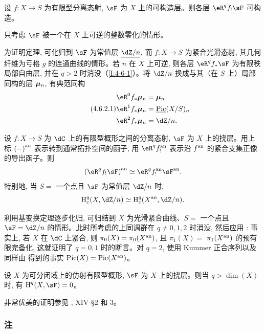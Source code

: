 \begin{theorem}[有限性定理]\label{I:4-6-2}
设 $f:X\to S$ 为有限型分离态射, $\sF$ 为 $X$ 上的可构造层。则各层 $\eR^qf_!\sF$ 可构造。
\end{theorem}

只考虑 $\sF$ 被一个在 $X$ 上可逆的整数零化的情形。

为证明定理, 可化归到 $\sF$ 为常值层 $\const{\dZ/n}$, 而 $f:X\to S$ 为紧合光滑态射, 其几何纤维为亏格 $g$ 的连通曲线的情形。若 $n$ 在 $X$ 上可逆, 则各层 $\eR^qf_*\sF$ 为有限秩局部自由层, 并在 $q>2$ 时消没（\ref{I:4-6-1}）。将 $\dZ/n$ 换成与其（在 $S$ 上）局部同构的层 ${\bm\mu}_n$, 有典范同构
\begin{equation*}\tag{4.6.2.1}\label{I:eq:4-6-2-1}
\begin{aligned}
  \eR^0 f_* \dmu_n &= \dmu_n \\
  \eR^1 f_* \dmu_n &= \const\pic(X/S)_n \\
  \eR^2 f_* \dmu_n &= \dZ/n \text{.}
\end{aligned}
\end{equation*}

\begin{theorem}[与经典上同调的比较]\label{I:4-6-3}
设 $f:X\to S$ 为 $\dC$ 上的有限型概形之间的分离态射, $\sF$ 为 $X$ 上的挠层。用上标 ${(-)}^{\textnormal{an}}$ 表示转到通常拓扑空间的函子, 用 $\eR^q\an f_!$ 表示沿 ${f}^{\textnormal{an}}$ 的紧合支集正像的导出函子。则
\[
  \an{(\eR^q f_! \sF)} \simeq \eR^q \an f_! \an \sF \text{.}
\]
特别地, 当 $S=$ 一个点且 $\sF$ 为常值层 $\dZ/n$ 时,
\[
  \h_c^q(X,\dZ/n) \simeq \h_c^q(\an X,\dZ/n)\text{.}
\]
\end{theorem}

利用基变换定理逐步化归, 可归结到 $X$ 为光滑紧合曲线、$S=$ 一个点且 $\sF=\dZ/n$ 的情形。此时所考虑的上同调群在 $q\ne0,1,2$ 时消没, 然后应用 \cite{se55}: 事实上, 若 $X$ 在 $\dC$ 上紧合, 则 $\pi_0(X)=\pi_0({X}^{\textnormal{an}})$, 且 $\pi_1(X)=$ $\pi_1({X}^{\textnormal{an}})$ 的预有限完备化, 这就证明了 $q=0,1$ 时的断言。对 $q=2$, 使用 Kummer 正合序列以及同样由 \cite{se55} 得到的事实 $\operatorname{Pic}(X)=\operatorname{Pic}({X}^{\textnormal{an}})$。

\begin{theorem}[仿射概形的上同调维数]\label{I:4-6-4}
设 $X$ 为可分闭域上的仿射有限型概形, $\sF$ 为 $X$ 上的挠层。则当 $q>\dim(X)$ 时, 有 $\h^q(X,\sF)=0$。
\end{theorem}

非常优美的证明参见 \cite{sga4}, XIV \S 2 和 3。

\subsubsection{注}\label{I:4-6-5}

